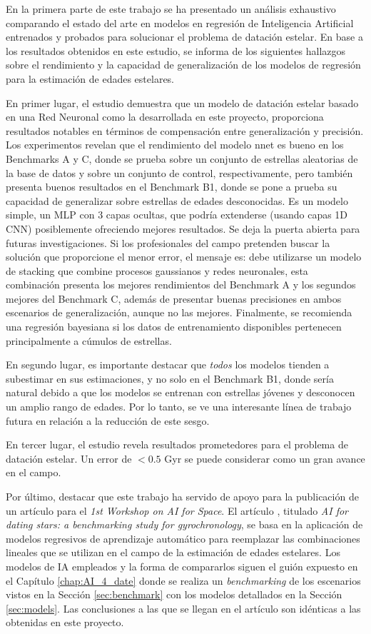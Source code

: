 En la primera parte de este trabajo se ha presentado un análisis exhaustivo comparando el estado del arte en modelos en regresión de Inteligencia Artificial entrenados y probados para solucionar el problema de datación estelar. En base a los resultados obtenidos en este estudio, se informa de los siguientes hallazgos sobre el rendimiento y la capacidad de generalización de los modelos de regresión para la estimación de edades estelares.

En primer lugar, el estudio demuestra que un modelo de datación estelar basado en una Red Neuronal como la desarrollada en este proyecto, proporciona resultados notables en términos de compensación entre generalización y precisión. Los experimentos revelan que el rendimiento del modelo nnet es bueno en los Benchmarks A y C, donde se prueba sobre un conjunto de estrellas aleatorias de la base de datos y sobre un conjunto de control, respectivamente, pero también presenta buenos resultados en el Benchmark B1, donde se pone a prueba su capacidad de generalizar sobre estrellas de edades desconocidas. Es un modelo simple, un MLP con 3 capas ocultas, que podría extenderse (usando capas 1D CNN) posiblemente ofreciendo mejores resultados. Se deja la puerta abierta para futuras investigaciones. Si los profesionales del campo pretenden buscar la solución que proporcione el menor error, el mensaje es: debe utilizarse un modelo de stacking que combine procesos gaussianos y redes neuronales, esta combinación presenta los mejores rendimientos del Benchmark A y los segundos mejores del Benchmark C, además de presentar buenas precisiones en ambos escenarios de generalización, aunque no las mejores. Finalmente, se recomienda una regresión bayesiana si los datos de entrenamiento disponibles pertenecen principalmente a cúmulos de estrellas.

En segundo lugar, es importante destacar que \emph{todos} los modelos tienden a subestimar en sus estimaciones, y no solo en el Benchmark B1, donde sería natural debido a que los modelos se entrenan con estrellas jóvenes y desconocen un amplio rango de edades. Por lo tanto, se ve una interesante línea de trabajo futura en relación a la reducción de este sesgo.

En tercer lugar, el estudio revela resultados prometedores para el problema de datación estelar. Un error de $<0.5$ Gyr se puede considerar como un gran avance en el campo.

Por último, destacar que este trabajo ha servido de apoyo para la publicación de un artículo para el \emph{1st Workshop on AI for Space}. El artículo \citep{AI4STARTS} , titulado \emph{AI for dating stars: a benchmarking study for gyrochronology}, se basa en la aplicación de modelos regresivos de aprendizaje automático para reemplazar las combinaciones lineales que se utilizan en el campo de la estimación de edades estelares. Los modelos de IA empleados y la forma de compararlos siguen el guión expuesto en el Capítulo \ref{chap:AI_4_date} donde se realiza un \emph{benchmarking} de los escenarios vistos en la Sección \ref{sec:benchmark} con los modelos detallados en la Sección \ref{sec:models}. Las conclusiones a las que se llegan en el artículo son idénticas a las obtenidas en este proyecto.

